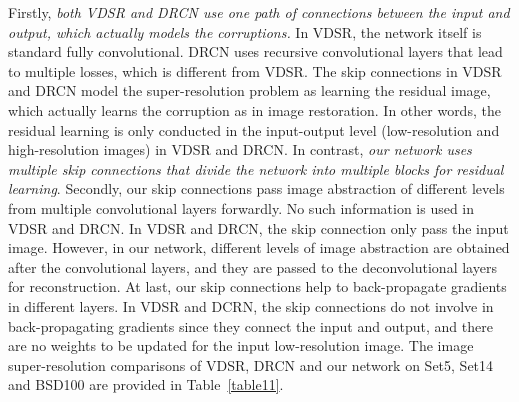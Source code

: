 \documentclass[10pt,journal,compsoc]{IEEEtran}
\begin{document}
Firstly, {\em both VDSR and DRCN use one path of connections between the input and output,
which actually models the corruptions.}  In VDSR, the network itself is standard fully convolutional.
DRCN uses recursive convolutional layers that lead to multiple losses, which is different from VDSR.
The skip connections in VDSR and DRCN model the super-resolution problem as learning the residual image,
which actually learns the corruption as in image restoration. In other words,
the residual learning is only conducted in the input-output level (low-resolution and high-resolution images)
in VDSR and DRCN. In contrast, {\em  our network uses multiple skip connections that divide the
network into multiple blocks for residual learning}. Secondly, our skip connections pass
image abstraction of different levels from multiple convolutional layers forwardly.
No such information is used in VDSR and DRCN. In VDSR and DRCN,
the skip connection only pass the input image. However, in our network,
different levels of image abstraction are obtained after the convolutional layers,
and they are passed to the deconvolutional layers for reconstruction. At last,
our skip connections help to back-propagate gradients in different layers. In VDSR and DCRN,
the skip connections do not involve in back-propagating gradients since they connect the input and output,
and there are no weights to be updated for the input low-resolution image.
The image super-resolution comparisons of VDSR, DRCN and our network on Set5,
Set14 and BSD100 are provided in Table~\ref{table11}.
\end{document}
